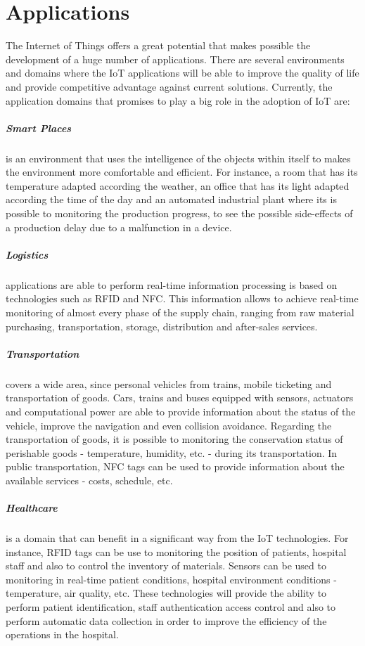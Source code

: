 \section{Applications}
\label{sec:applications}
The Internet of Things offers a great potential that makes possible the development of a huge number
of applications. There are several environments and domains where the \gls{IoT} applications will be
able to improve the quality of life and provide competitive advantage against current solutions.
Currently, the application domains that promises to play a big role in the adoption of \gls{IoT} are:
\subparagraph{Smart Places} is an environment that uses the intelligence of the objects within itself
to makes the environment more comfortable and efficient. For instance, a room that has its
temperature adapted according the weather, an office that has its light adapted according the time of
the day and an automated industrial plant where its is possible to monitoring the production progress,
to see the possible side-effects of a production delay due to a malfunction in a device.
\subparagraph{Logistics} applications are able to perform real-time information processing is based
on technologies such as \gls{RFID} and NFC. This information allows to achieve real-time monitoring
of almost every phase of the supply chain, ranging from raw material purchasing, transportation,
storage, distribution and after-sales services.
\subparagraph{Transportation} covers a wide area, since personal vehicles from trains, mobile ticketing
and transportation of goods. Cars, trains and buses equipped with sensors, actuators and computational
power are able to provide information about the status of the vehicle, improve the navigation and even
collision avoidance. Regarding the transportation of goods, it is possible to monitoring the conservation
status of perishable goods - temperature, humidity, etc. -  during its transportation. In public
transportation, NFC tags can be used to provide information about the available services - costs,
schedule, etc.
\subparagraph{Healthcare} is a domain that can benefit in a significant way from the \gls{IoT}
technologies. For instance, \gls{RFID} tags can be use to monitoring the position of patients,
hospital staff and also to control the inventory of materials. Sensors can be used to monitoring
in real-time patient conditions, hospital environment conditions - temperature, air quality, etc.
These technologies will provide the ability to perform patient identification, staff authentication
access control and also to perform automatic data collection in order to improve the efficiency of
the operations in the hospital. 

